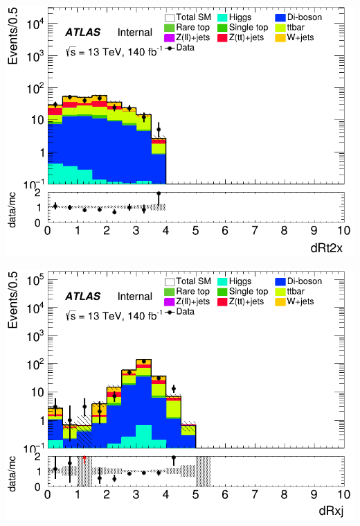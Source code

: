 \documentclass[usenames,dvipsnames]{beamer}
\begin{document}
\begin{frame}
    \begin{minipage}{0.32\textwidth}
        \centering
        \includegraphics[width=\textwidth]{graphics/LHH_met/LHH_met_dRt2x.png}
    \end{minipage}
    \hfill
    \begin{minipage}{0.32\textwidth}
        \centering
        \includegraphics[width=\textwidth]{graphics/LHH_met/LHH_met_dRxj.png}
    \end{minipage}
    \hfill
    \begin{minipage}{0.32\textwidth}
        \centering

\end{minipage}
\end{frame}
\end{document}
